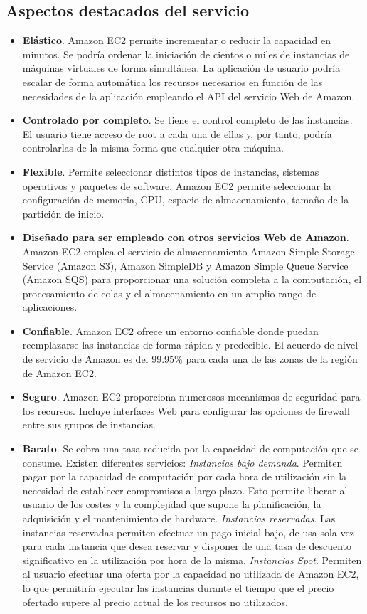 \documentclass[runningheads]{llncs}
\begin{document}
\subsection{Aspectos destacados del servicio}

\begin{itemize}
 \item \textbf{Elástico}. Amazon EC2 permite incrementar o reducir la capacidad en minutos. Se podría ordenar la iniciación de 
 cientos o miles de instancias de máquinas virtuales de forma simultánea. La aplicación de usuario podría escalar de forma automática 
 los recursos necesarios en función de las necesidades de la aplicación empleando el API del servicio Web de Amazon.
 \item \textbf{Controlado por completo}. Se tiene el control completo de las instancias. El usuario tiene acceso de root a cada una
 de ellas y, por tanto, podría controlarlas de la misma forma que cualquier otra máquina.
 \item \textbf{Flexible}. Permite seleccionar distintos tipos de instancias, sistemas operativos y paquetes de software. Amazon EC2 
 permite seleccionar la configuración de memoria, CPU, espacio de almacenamiento, tamaño de la partición de inicio. 
 \item \textbf{Diseñado para ser empleado con otros servicios Web de Amazon}. Amazon EC2 emplea el servicio de almacenamiento 
 Amazon Simple Storage Service (Amazon S3), Amazon SimpleDB y Amazon Simple Queue Service (Amazon SQS) para proporcionar una solución 
 completa a la computación, el procesamiento de colas y el almacenamiento en un amplio rango de aplicaciones.
 \item \textbf{Confiable}. Amazon EC2 ofrece un entorno confiable donde puedan reemplazarse las instancias de forma rápida y 
 predecible. El acuerdo de nivel de servicio de Amazon es del 99.95\% para cada una de las zonas de la región de Amazon EC2.
 \item \textbf{Seguro}. Amazon EC2 proporciona numerosos mecanismos de seguridad para los recursos. Incluye interfaces Web para 
 configurar las opciones de firewall entre sus grupos de instancias.
 \item \textbf{Barato}. Se cobra una tasa reducida por la capacidad de computación que se consume. Existen diferentes 
 servicios:
  \subitem \textit{Instancias bajo demanda}. Permiten pagar por la capacidad de computación por cada hora de utilización sin la necesidad 
  de establecer compromisos a largo plazo. Esto permite liberar al usuario de los costes y la complejidad que supone la planificación, 
  la adquisición y el mantenimiento de hardware.
  \subitem \textit{Instancias reservadas}. Las instancias reservadas permiten efectuar un pago inicial bajo, de usa sola vez para 
  cada instancia que desea reservar y disponer de una tasa de descuento significativo en la utilización por hora de la misma.
  \subitem \textit{Instancias Spot}. Permiten al usuario efectuar una oferta por la capacidad no utilizada de Amazon EC2, lo que 
  permitiría ejecutar las instancias durante el tiempo que el precio ofertado supere al precio actual de los recursos no utilizados.

\end{itemize}
\end{document}
